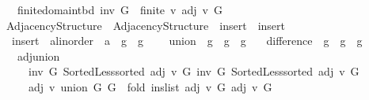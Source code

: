 \begin{isabellebody}
\ \ \ finite{\isacharunderscore}{\kern0pt}domain{\isacharunderscore}{\kern0pt}tbd{\isacharcolon}{\kern0pt}\ {\isachardoublequoteopen}inv\ G\ {\isasymLongrightarrow}\ finite\ {\isacharbraceleft}{\kern0pt}v{\isachardot}{\kern0pt}\ adj\ v\ G\ {\isasymnoteq}\ {\isacharbrackleft}{\kern0pt}{\isacharbrackright}{\kern0pt}{\isacharbraceright}{\kern0pt}{\isachardoublequoteclose}\isanewline
\isanewline
{}\isamarkupfalse%
\ Adjacency{\isacharunderscore}{\kern0pt}Structure{\isacharunderscore}{\kern0pt}{}\ {\isacharequal}{\kern0pt}\ Adjacency{\isacharunderscore}{\kern0pt}Structure\ \ insert\ {\isacharequal}{\kern0pt}\ insert\ \isanewline
\ \ insert\ {\isacharcolon}{\kern0pt}{\isacharcolon}{\kern0pt}\ {\isachardoublequoteopen}{\isacharprime}{\kern0pt}a{\isacharcolon}{\kern0pt}{\isacharcolon}{\kern0pt}linorder\ {\isasymRightarrow}\ {\isacharprime}{\kern0pt}a\ {\isasymRightarrow}\ {\isacharprime}{\kern0pt}g\ {\isasymRightarrow}\ {\isacharprime}{\kern0pt}g{\isachardoublequoteclose}\ {\isacharplus}{\kern0pt}\isanewline
\ \ \ union\ {\isacharcolon}{\kern0pt}{\isacharcolon}{\kern0pt}\ {\isachardoublequoteopen}{\isacharprime}{\kern0pt}g\ {\isasymRightarrow}\ {\isacharprime}{\kern0pt}g\ {\isasymRightarrow}\ {\isacharprime}{\kern0pt}g{\isachardoublequoteclose}\isanewline
\ \ \ difference\ {\isacharcolon}{\kern0pt}{\isacharcolon}{\kern0pt}\ {\isachardoublequoteopen}{\isacharprime}{\kern0pt}g\ {\isasymRightarrow}\ {\isacharprime}{\kern0pt}g\ {\isasymRightarrow}\ {\isacharprime}{\kern0pt}g{\isachardoublequoteclose}\isanewline
\ \ \ adj{\isacharunderscore}{\kern0pt}union{\isacharcolon}{\kern0pt}\isanewline
\ \ \ \ {\isachardoublequoteopen}{\isasymlbrakk}\ inv\ G{}{\isacharsemicolon}{\kern0pt}\ Sorted{\isacharunderscore}{\kern0pt}Less{\isachardot}{\kern0pt}sorted\ {\isacharparenleft}{\kern0pt}adj\ v\ G{}{\isacharparenright}{\kern0pt}{\isacharsemicolon}{\kern0pt}\ inv\ G{}{\isacharsemicolon}{\kern0pt}\ Sorted{\isacharunderscore}{\kern0pt}Less{\isachardot}{\kern0pt}sorted\ {\isacharparenleft}{\kern0pt}adj\ v\ G{}{\isacharparenright}{\kern0pt}\ {\isasymrbrakk}\ {\isasymLongrightarrow}\isanewline
\ \ \ \ \ adj\ v\ {\isacharparenleft}{\kern0pt}union\ G{}\ G{}{\isacharparenright}{\kern0pt}\ {\isacharequal}{\kern0pt}\ fold\ ins{\isacharunderscore}{\kern0pt}list\ {\isacharparenleft}{\kern0pt}adj\ v\ G{}{\isacharparenright}{\kern0pt}\ {\isacharparenleft}{\kern0pt}adj\ v\ G{}{\isacharparenright}{\kern0pt}{\isachardoublequoteclose}\isanewline

\end{isabellebody}
